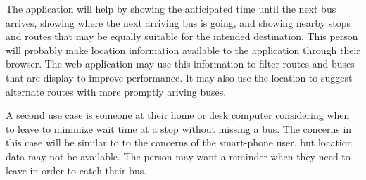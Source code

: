 \documentclass[12pt]{report}
\begin{document}
The application will help by showing the anticipated time until the next bus arrives, showing where the next arriving bus is going, and showing nearby stops and routes that may be equally suitable for the intended destination.  This person will probably make location information available to the application through their browser.  The web application may use this information to filter routes and buses that are display to improve performance.  It may also use the location to suggest alternate routes with more promptly ariving buses. 

A second use case is someone at their home or desk computer considering when to leave to minimize wait time at a stop without missing a bus.  The concerns in this case will be similar to to the concerns of the smart-phone user, but location data may not be available.  The person may want a reminder when they need to leave in order to catch their bus.
  
\end{document}
